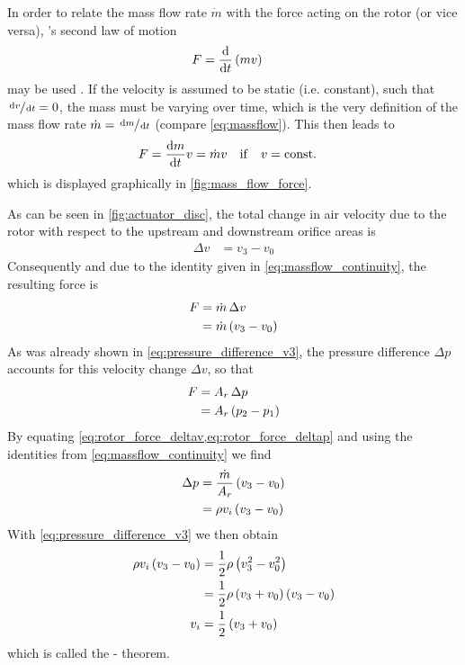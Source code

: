 In order to relate the mass flow rate $\dot{m}$ with the force acting on the rotor (or vice versa), 's second law of motion
%
\begin{align}
F &= \frac{\mathop{}\!\mathrm{d}}{\mathop{}\!\mathrm{d} t} \left( m v \right) \label{eq:newtons_2nd}
\end{align}
%
may be used \cite{book:siekmann2008}.
If the velocity is assumed to be static (i.e. constant), such that $\sfrac{\mathop{}\!\mathrm{d} v}{\mathop{}\!\mathrm{d} t} = 0$, the mass must be varying over time, which is the very definition of the mass flow rate $\dot{m} = \sfrac{\mathop{}\!\mathrm{d} m}{\mathop{}\!\mathrm{d} t}$ (compare \cref{eq:massflow}). 
This then leads to
%
\begin{align}
F &= \frac{\mathop{}\!\mathrm{d} m}{\mathop{}\!\mathrm{d} t} v = \dot{m} v \quad \mathrm{if} \quad v = \mathrm{const.} \label{eq:newtons_2nd_mdot}
\end{align}
%
which is displayed graphically in \cref{fig:mass_flow_force}.

As can be seen in \cref{fig:actuator_disc}, the total change in air velocity due to the rotor with respect to the upstream and downstream orifice areas is
%
\begin{align}
\Delta v &= v_3 - v_0
\end{align}
%
Consequently and due to the identity given in \cref{eq:massflow_continuity}, the resulting force is
%
\begin{align}
F &= \dot{m} \, \Delta v \\ 
  &= \dot{m} \left( v_3 - v_0 \right) \label{eq:rotor_force_deltav}
\end{align}
%
As was already shown in \cref{eq:pressure_difference_v3}, the pressure difference $\Delta p$ accounts for this velocity change $\Delta v$, so that
%
\begin{align}
F &= A_r \, \Delta p \\
  &= A_r \left( p_2 - p_1 \right) \label{eq:rotor_force_deltap}
\end{align}
%
By equating \cref{eq:rotor_force_deltav,eq:rotor_force_deltap} and using the identities from \cref{eq:massflow_continuity} we find
%
\begin{align}
 \Delta p &= \frac{\dot{m}}{A_r} \left( v_3 - v_0 \right) \\
                      &= \rho v_i \left( v_3 - v_0 \right)
\end{align}
%
With \cref{eq:pressure_difference_v3} we then obtain
%
\begin{align}
\rho v_i \left( v_3 - v_0 \right) &= \frac{1}{2} \rho \left( v^2_3 - v^2_0 \right) \label{eq:froude_rankine_proof} \\
         &= \frac{1}{2} \rho \left( v_3 + v_0 \right) \left( v_3 - v_0 \right) \notag \\
v_i &= \frac{1}{2} \left( v_3 + v_0 \right) \label{eq:froude_rankine_theorem}
\end{align}
%
which is called the - theorem.

